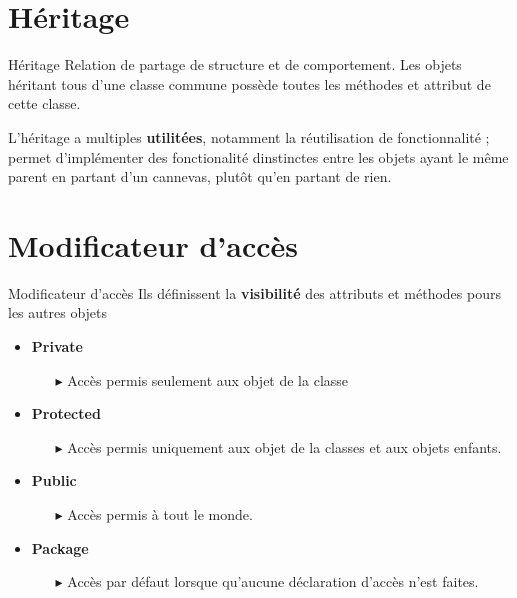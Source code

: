 \documentclass[16pt]{report}
\begin{document}
\begin{multicols*}{2}
            \section{Héritage}
            \begin{Definitionx}{Héritage}{}
                Relation de \textcolor{myb}{partage de structure et de comportement}. Les objets héritant tous 
                d'une classe commune possède toutes les méthodes et attribut de cette classe. 
            \end{Definitionx}

            \begin{note}{}{}
                L'héritage a multiples \textbf{utilitées}, notamment la réutilisation de fonctionnalité ; 
                permet d'implémenter des fonctionalité dinstinctes entre les objets ayant le même 
                parent en partant d'un cannevas, plutôt qu'en partant de rien. 
            \end{note}


            \section{Modificateur d'accès}
            \begin{Definitionx}{Modificateur d'accès}{}
                Ils définissent la \textbf{visibilité} des attributs et méthodes pours les autres objets
            \end{Definitionx}

            \begin{itemize}
                \item \textbf{Private}    
                    \begin{itemize}
                        \item[$\blacktriangleright$] Accès permis seulement aux objet de la classe
                    \end{itemize} 
                \item \textbf{Protected}  
                    \begin{itemize}
                        \item[$\blacktriangleright$] Accès permis uniquement aux objet de la classes et aux objets 
                            enfants. 
                    \end{itemize}
                \item \textbf{Public}  
                    \begin{itemize}
                        \item[$\blacktriangleright$] Accès permis à tout le monde. 
                    \end{itemize}
                \item \textbf{Package}  
                    \begin{itemize}
                        \item[$\blacktriangleright$] Accès \textcolor{myb}{par défaut} lorsque qu'aucune déclaration 
                            d'accès n'est faites. 
                    \end{itemize}
            \end{itemize}


\end{multicols*}
\end{document}

